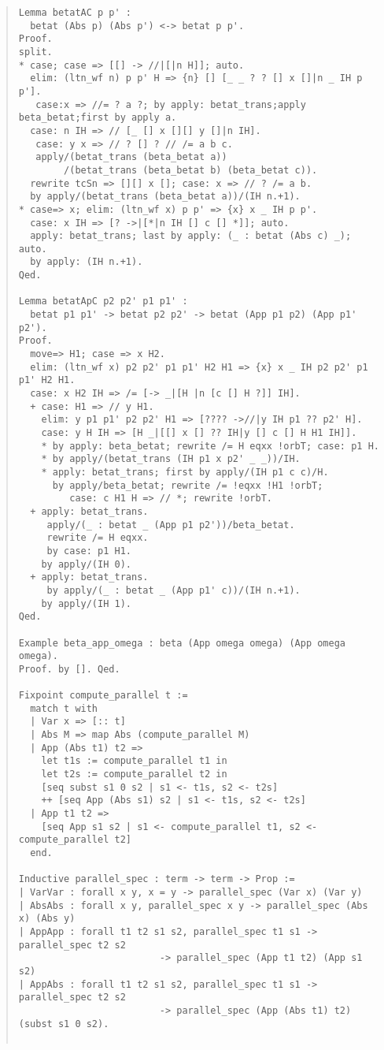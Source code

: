 \documentclass[12pt, titlepage]{ltjsarticle}
\begin{document}
\begin{quote}
\begin{verbatim}
Lemma betatAC p p' : 
  betat (Abs p) (Abs p') <-> betat p p'.
Proof.
split.
* case; case => [[] -> //|[|n H]]; auto.
  elim: (ltn_wf n) p p' H => {n} [] [_ _ ? ? [] x []|n _ IH p p']. 
   case:x => //= ? a ?; by apply: betat_trans;apply beta_betat;first by apply a.
  case: n IH => // [_ [] x [][] y []|n IH].
   case: y x => // ? [] ? // /= a b c.
   apply/(betat_trans (beta_betat a))
        /(betat_trans (beta_betat b) (beta_betat c)).
  rewrite tcSn => [][] x []; case: x => // ? /= a b.
  by apply/(betat_trans (beta_betat a))/(IH n.+1).
* case=> x; elim: (ltn_wf x) p p' => {x} x _ IH p p'.
  case: x IH => [? ->|[*|n IH [] c [] *]]; auto.
  apply: betat_trans; last by apply: (_ : betat (Abs c) _); auto.
  by apply: (IH n.+1).
Qed.

Lemma betatApC p2 p2' p1 p1' : 
  betat p1 p1' -> betat p2 p2' -> betat (App p1 p2) (App p1' p2').
Proof.
  move=> H1; case => x H2.
  elim: (ltn_wf x) p2 p2' p1 p1' H2 H1 => {x} x _ IH p2 p2' p1 p1' H2 H1.
  case: x H2 IH => /= [-> _|[H |n [c [] H ?]] IH].
  + case: H1 => // y H1.
    elim: y p1 p1' p2 p2' H1 => [???? ->//|y IH p1 ?? p2' H].
    case: y H IH => [H _|[[] x [] ?? IH|y [] c [] H H1 IH]].
    * by apply: beta_betat; rewrite /= H eqxx !orbT; case: p1 H.
    * by apply/(betat_trans (IH p1 x p2' _ _))/IH.
    * apply: betat_trans; first by apply/(IH p1 c c)/H.
      by apply/beta_betat; rewrite /= !eqxx !H1 !orbT;
         case: c H1 H => // *; rewrite !orbT.
  + apply: betat_trans.
     apply/(_ : betat _ (App p1 p2'))/beta_betat.
     rewrite /= H eqxx.
     by case: p1 H1.
    by apply/(IH 0).
  + apply: betat_trans.
     by apply/(_ : betat _ (App p1' c))/(IH n.+1).
    by apply/(IH 1).
Qed.

Example beta_app_omega : beta (App omega omega) (App omega omega).
Proof. by []. Qed.

Fixpoint compute_parallel t :=
  match t with
  | Var x => [:: t]
  | Abs M => map Abs (compute_parallel M)
  | App (Abs t1) t2 =>
    let t1s := compute_parallel t1 in
    let t2s := compute_parallel t2 in
    [seq subst s1 0 s2 | s1 <- t1s, s2 <- t2s]
    ++ [seq App (Abs s1) s2 | s1 <- t1s, s2 <- t2s]
  | App t1 t2 =>
    [seq App s1 s2 | s1 <- compute_parallel t1, s2 <- compute_parallel t2]
  end.

Inductive parallel_spec : term -> term -> Prop :=
| VarVar : forall x y, x = y -> parallel_spec (Var x) (Var y)
| AbsAbs : forall x y, parallel_spec x y -> parallel_spec (Abs x) (Abs y)
| AppApp : forall t1 t2 s1 s2, parallel_spec t1 s1 -> parallel_spec t2 s2
                         -> parallel_spec (App t1 t2) (App s1 s2)
| AppAbs : forall t1 t2 s1 s2, parallel_spec t1 s1 -> parallel_spec t2 s2
                         -> parallel_spec (App (Abs t1) t2) (subst s1 0 s2).


\end{verbatim}
\end{quote}
\end{document}
